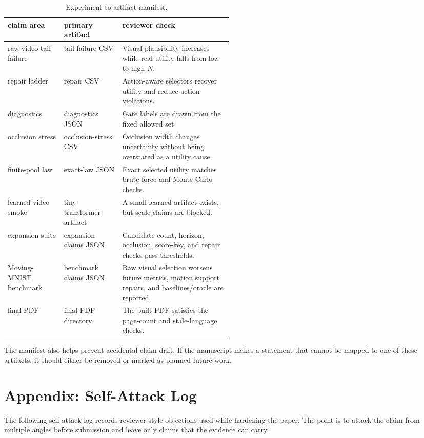 \documentclass{article}
\begin{document}
\begin{table}[tbp]
  \centering
  \small
  \caption{Experiment-to-artifact manifest.}
  \label{tab:experiment-manifest}
  \begin{tabularx}{\linewidth}{@{}p{0.25\linewidth}p{0.26\linewidth}X@{}}
    \toprule
    claim area & primary artifact & reviewer check \\
    \midrule
    raw video-tail failure & tail-failure CSV & Visual plausibility increases while real utility falls from low to high \(N\). \\
    repair ladder & repair CSV & Action-aware selectors recover utility and reduce action violations. \\
    diagnostics & diagnostics JSON & Gate labels are drawn from the fixed allowed set. \\
    occlusion stress & occlusion-stress CSV & Occlusion width changes uncertainty without being overstated as a utility cause. \\
    finite-pool law & exact-law JSON & Exact selected utility matches brute-force and Monte Carlo checks. \\
    learned-video smoke & tiny transformer artifact & A small learned artifact exists, but scale claims are blocked. \\
    expansion suite & expansion claims JSON & Candidate-count, horizon, occlusion, score-key, and repair checks pass thresholds. \\
    Moving-MNIST benchmark & benchmark claims JSON & Raw visual selection worsens future metrics, motion support repairs, and baselines/oracle are reported. \\
    final PDF & final PDF directory & The built PDF satisfies the page-count and stale-language checks. \\
    \bottomrule
  \end{tabularx}
\end{table}

The manifest also helps prevent accidental claim drift. If the manuscript makes a statement that cannot be mapped to one of these artifacts, it should either be removed or marked as planned future work.

\section{Appendix: Self-Attack Log}
\label{app:self-attack-log}

The following self-attack log records reviewer-style objections used while hardening the paper. The point is to attack the claim from multiple angles before submission and leave only claims that the evidence can carry.
\end{document}
